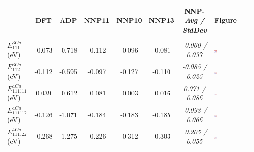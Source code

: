 \documentclass{article}
\begin{document}
%

\begin{table}[H]
\begin{tabular}{l|ccccccV}%
\hline%
&DFT&ADP& NNP11& NNP10& NNP13& NNP-\emph{Avg / StdDev} & Figure \\%
\hline%
\hline%
&&&&&&& \\
$E^{3Cu}_{111}$ (eV)&-0.073&{-}0.718&{-}0.112& -0.096&{-}0.081&\emph{-0.060 / 0.037}  & \includegraphics[width=0.07\textwidth]{figures/SoluteCluster_111.png}  \\%
$E^{3Cu}_{112}$ (eV)&-0.112&{-}0.595&{-}0.097& -0.127 &{-}0.110&\emph{-0.085 / 0.025}  &  \includegraphics[width=0.07\textwidth]{figures/SoluteCluster_112.png}\\%
$E^{4Cu}_{111111}$(eV)&0.039&{-}0.612&{-}0.081& -0.003 &{-}0.016&\emph{0.071 / 0.086}  &  \includegraphics[width=0.07\textwidth]{figures/SoluteCluster_111111.png}\\%
$E^{4Cu}_{111112}$(eV)&-0.126&{-}1.071&{-}0.184& -0.183 &{-}0.185&\emph{-0.093 / 0.066}& \includegraphics[width=0.07\textwidth]{figures/SoluteCluster_111112.png} \\%
$E^{4Cu}_{111122}$(eV)&-0.268&{-}1.275&{-}0.226& -0.312 &{-}0.303&\emph{-0.205 / 0.055}&  \includegraphics[width=0.07\textwidth]{figures/SoluteCluster_111122.png}\\%

\end{tabular}
\end{table}
\end{document}
